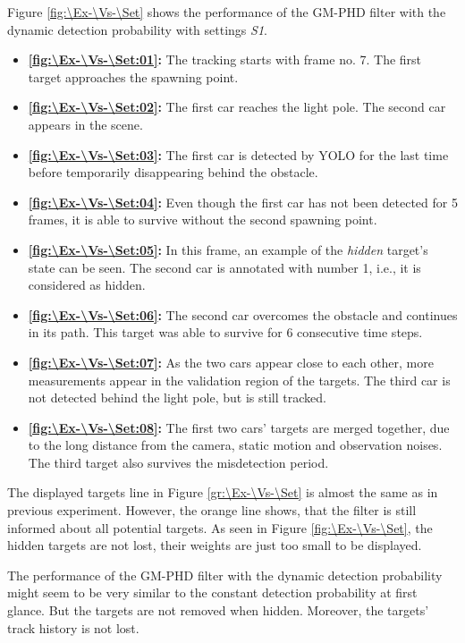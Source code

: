 Figure \ref{fig:\Ex-\Vs-\Set} shows the performance of the GM-PHD filter with the dynamic detection probability with settings \textit{S1}.
\begin{itemize}
    \item \textbf{\ref{fig:\Ex-\Vs-\Set:01}:} The tracking starts with frame no. 7. The first target approaches the spawning point.
    \item \textbf{\ref{fig:\Ex-\Vs-\Set:02}:} The first car reaches the light pole. The second car appears in the scene.
    \item \textbf{\ref{fig:\Ex-\Vs-\Set:03}:} The first car is detected by YOLO for the last time before
    temporarily disappearing
    behind the obstacle.
    \item \textbf{\ref{fig:\Ex-\Vs-\Set:04}:} Even though the first car has not been detected for 5 frames, it is able
    to survive without the second spawning point.
    \item \textbf{\ref{fig:\Ex-\Vs-\Set:05}:} In this frame, an example of the \textit{hidden} target's state can be
    seen. The second car is annotated with number 1, i.e., it is considered as hidden.
    \item \textbf{\ref{fig:\Ex-\Vs-\Set:06}:} The second car overcomes the obstacle and continues in its path. This target was able to survive for 6 consecutive time steps.
    \item \textbf{\ref{fig:\Ex-\Vs-\Set:07}:} As the two cars appear close to each other, more measurements appear in
    the validation region of the targets. The third car is not detected behind the light pole, but is still tracked.
    \item \textbf{\ref{fig:\Ex-\Vs-\Set:08}:} The first two cars' targets are merged together, due to the long distance
    from the camera, static motion and observation noises. The third target also survives the misdetection period.
\end{itemize}

The displayed targets line in Figure \ref{gr:\Ex-\Vs-\Set} is almost the same as in previous experiment. However, the
orange line shows, that the filter is still informed about all potential targets. As seen in Figure \ref{fig:\Ex-\Vs-\Set}, the hidden targets are not lost, their weights are just too small to be displayed.

The performance of the GM-PHD filter with the dynamic detection probability might seem to be very similar to the
constant detection probability at first glance. But the targets are not removed when hidden. Moreover, the targets' track history is not lost.

